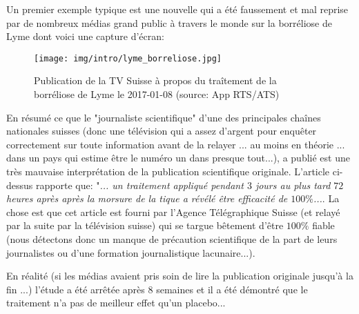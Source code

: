 	Un premier exemple typique est une nouvelle qui a \'et\'e faussement et mal reprise par de nombreux m\'edias grand public à travers le monde sur la borr\'eliose de Lyme dont voici une capture d'\'ecran:
	\begin{figure}[H]
		\centering
		\texttt{[image: img/intro/lyme\_borreliose.jpg]}
		\caption[Publication de la T\'el\'evision Suisse sur le traîtement de la borr\'eliose de Lyme]{Publication de la TV Suisse à propos du traîtement de la\\ borr\'eliose de Lyme le 2017-01-08 (source: App RTS/ATS)}
	\end{figure}
	En r\'esum\'e ce que le "journaliste scientifique" d'une des principales chaînes nationales suisses (donc une t\'el\'evision qui a assez d'argent pour enquêter correctement sur toute information avant de la relayer ... au moins en th\'eorie ... dans un pays qui estime être le num\'ero un dans presque tout...), a publi\'e est une très mauvaise interpr\'etation de la publication scientifique originale. L'article ci-dessus rapporte que: "\textit{... un traitement appliqu\'e pendant $3$ jours au plus tard $72$ heures après après la morsure de la tique a r\'ev\'el\'e être efficacit\'e de $100\%$...}. La chose est que cet article est fourni par l'Agence T\'el\'egraphique Suisse (et relay\'e par la suite par la t\'el\'evision suisse) qui se targue bêtement d'être $100 \%$ fiable (nous d\'etectons donc un manque de pr\'ecaution scientifique de la part de leurs journalistes ou d'une formation journalistique lacunaire...).
	
	En r\'ealit\'e (si les m\'edias avaient pris soin de lire la publication originale jusqu'à la fin ...) l'\'etude a \'et\'e arrêt\'ee après $8$ semaines et il a \'et\'e d\'emontr\'e que le traitement n'a pas de meilleur effet qu'un placebo...
	
